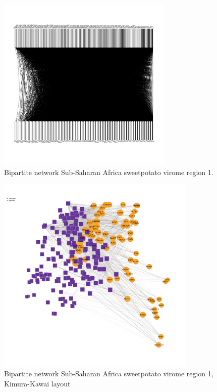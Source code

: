 \documentclass{article}
\begin{document}
\begin{figure}[h!]
\begin{center}
\includegraphics[width=0.75\textwidth]{../results/k-cluster1/1-kcluster_bipartitenetwork_Feb28.pdf} %
\caption{Bipartite network Sub-Saharan Africa sweetpotato virome region 1.}
\end{center}
\end{figure}



\begin{figure}[h!]
\begin{center}
\includegraphics[width=0.85\textwidth]{../results/k-cluster1/1-kcluster_bipartitenetwork-kk_Feb28.pdf
} %
\caption{Bipartite network Sub-Saharan Africa sweetpotato virome region 1, Kimura-Kawai layout}
\end{center}
\end{figure}
\end{document}

